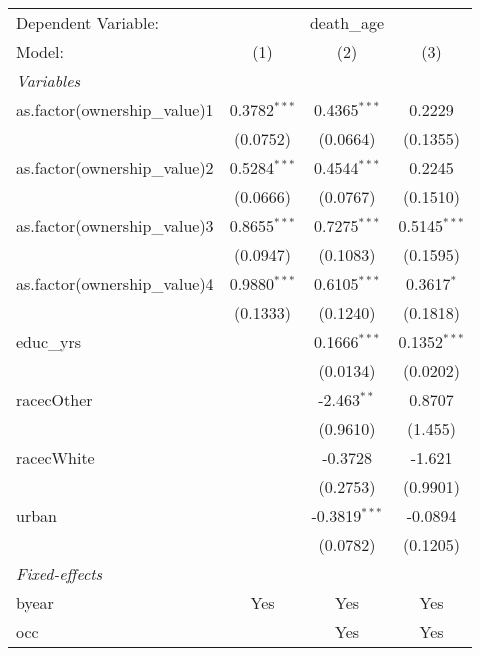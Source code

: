 
\begingroup
\centering
\begin{tabular}{lccc}
   \tabularnewline \midrule \midrule
   Dependent Variable: & \multicolumn{3}{c}{death\_age}\\
   Model:                        & (1)            & (2)             & (3)\\  
   \midrule
   \emph{Variables}\\
   as.factor(ownership\_value)1  & 0.3782$^{***}$ & 0.4365$^{***}$  & 0.2229\\   
                                 & (0.0752)       & (0.0664)        & (0.1355)\\   
   as.factor(ownership\_value)2  & 0.5284$^{***}$ & 0.4544$^{***}$  & 0.2245\\   
                                 & (0.0666)       & (0.0767)        & (0.1510)\\   
   as.factor(ownership\_value)3  & 0.8655$^{***}$ & 0.7275$^{***}$  & 0.5145$^{***}$\\   
                                 & (0.0947)       & (0.1083)        & (0.1595)\\   
   as.factor(ownership\_value)4  & 0.9880$^{***}$ & 0.6105$^{***}$  & 0.3617$^{*}$\\   
                                 & (0.1333)       & (0.1240)        & (0.1818)\\   
   educ\_yrs                     &                & 0.1666$^{***}$  & 0.1352$^{***}$\\   
                                 &                & (0.0134)        & (0.0202)\\   
   racecOther                    &                & -2.463$^{**}$   & 0.8707\\   
                                 &                & (0.9610)        & (1.455)\\   
   racecWhite                    &                & -0.3728         & -1.621\\   
                                 &                & (0.2753)        & (0.9901)\\   
   urban                         &                & -0.3819$^{***}$ & -0.0894\\   
                                 &                & (0.0782)        & (0.1205)\\   
   \midrule
   \emph{Fixed-effects}\\
   byear                         & Yes            & Yes             & Yes\\  
   occ                           &                & Yes             & Yes\\  

\end{tabular}
